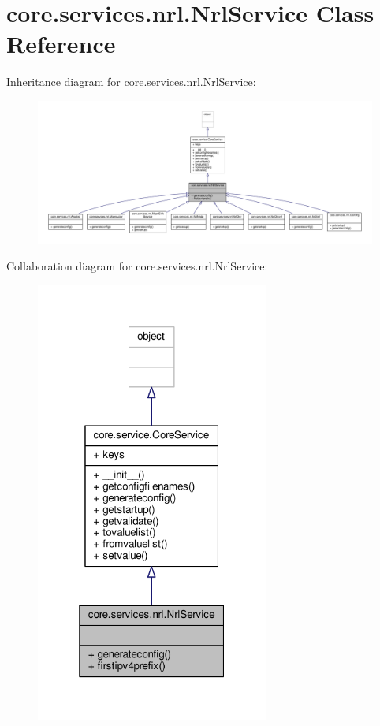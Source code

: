\hypertarget{classcore_1_1services_1_1nrl_1_1_nrl_service}{\section{core.\+services.\+nrl.\+Nrl\+Service Class Reference}
\label{classcore_1_1services_1_1nrl_1_1_nrl_service}
}


Inheritance diagram for core.\+services.\+nrl.\+Nrl\+Service\+:
\nopagebreak
\begin{figure}[H]
\begin{center}
\leavevmode
\includegraphics[width=350pt]{classcore_1_1services_1_1nrl_1_1_nrl_service__inherit__graph}
\end{center}
\end{figure}


Collaboration diagram for core.\+services.\+nrl.\+Nrl\+Service\+:
\nopagebreak
\begin{figure}[H]
\begin{center}
\leavevmode
\includegraphics[width=217pt]{classcore_1_1services_1_1nrl_1_1_nrl_service__coll__graph}
\end{center}
\end{figure}
